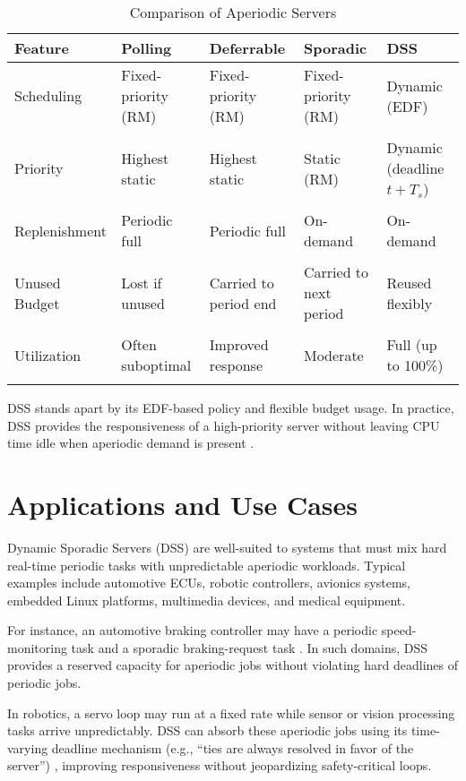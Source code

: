 \documentclass[conference]{IEEEtran}
\begin{document}
\begin{table}[ht]
\centering
\renewcommand{\arraystretch}{1.1} %
\begin{tabularx}{\columnwidth}{l|X|X|X|X}
\textbf{Feature} & \textbf{Polling} & \textbf{Deferrable} & \textbf{Sporadic} & \textbf{DSS} \\
\hline
Scheduling & Fixed-priority (RM) & Fixed-priority (RM) & Fixed-priority (RM) & Dynamic (EDF) \\\\
Priority & Highest static & Highest static & Static (RM) & Dynamic (deadline $t+T_s$) \\\\
Replenishment & Periodic full & Periodic full & On-demand & On-demand \\\\
Unused Budget & Lost if unused & Carried to period end & Carried to next period & Reused flexibly \\\\
Utilization & Often suboptimal & Improved response & Moderate & Full (up to 100\%) \\\\
\end{tabularx}
\caption{Comparison of Aperiodic Servers}
\label{tab:servers}
\end{table}


DSS stands apart by its EDF-based policy and flexible budget usage.  In practice, DSS provides the responsiveness of a high-priority server without leaving CPU time idle when aperiodic demand is present \cite{buttazzo2011hard, laplante2011real}.

\section{Applications and Use Cases}

Dynamic Sporadic Servers (DSS) are well-suited to systems that must mix hard real-time periodic tasks with unpredictable aperiodic workloads. Typical examples include automotive ECUs, robotic controllers, avionics systems, embedded Linux platforms, multimedia devices, and medical equipment.

For instance, an automotive braking controller may have a periodic speed-monitoring task and a sporadic braking-request task \cite{diva2020ecu}. In such domains, DSS provides a reserved capacity for aperiodic jobs without violating hard deadlines of periodic jobs.

In robotics, a servo loop may run at a fixed rate while sensor or vision processing tasks arrive unpredictably. DSS can absorb these aperiodic jobs using its time-varying deadline mechanism (e.g., “ties are always resolved in favor of the server”) \cite{cpen432}, improving responsiveness without jeopardizing safety-critical loops.
\end{document}
